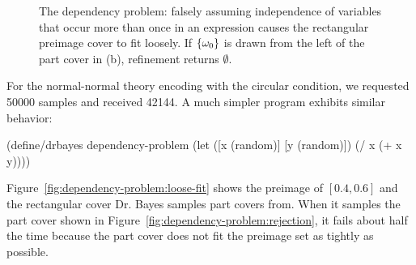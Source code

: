 \begin{figure}[tb!]
{}%
\tab%
%
\caption[The dependency problem]{The dependency problem: falsely assuming independence of variables that occur more than once in an expression causes the rectangular preimage cover to fit loosely.
If $\{{\omega_0}\}$ is drawn from the left of the part cover in (b), refinement returns $\emptyset$.}
\label{fig:dependency-problem}
\end{figure}

For the normal-normal theory encoding with the circular condition, we requested 50000 samples and received 42144.
A much simpler program exhibits similar behavior:
\begin{center}\singlespacing
\begin{schemedisplay}
(define/drbayes dependency-problem
  (let ([x  (random)]
        [y  (random)])
    (/ x (+ x y))))
\end{schemedisplay}
\end{center}
Figure~\ref{fig:dependency-problem:loose-fit} shows the preimage of $[0.4,0.6]$ and the rectangular cover Dr. Bayes samples part covers from.
When it samples the part cover shown in Figure~\ref{fig:dependency-problem:rejection}, it fails about half the time because the part cover does not fit the preimage set as tightly as possible.

